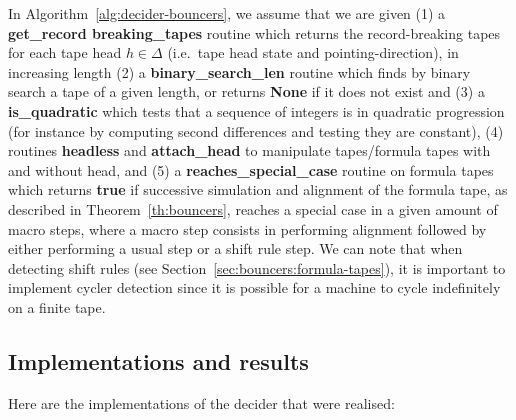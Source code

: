 \begin{remark}
    In Algorithm~\ref{alg:decider-bouncers}, we assume that we are given (1) a \textbf{get\_record breaking\_tapes} routine which returns the record-breaking tapes for each tape head $h\in\Delta$ (i.e.\ tape head state and pointing-direction), in increasing length (2) a \textbf{binary\_search\_len} routine which finds by binary search a tape of a given length, or returns \textbf{None} if it does not exist and (3) a \textbf{is\_quadratic} which tests that a sequence of integers is in quadratic progression (for instance by computing second differences and testing they are constant), (4) routines \textbf{headless} and \textbf{attach\_head} to manipulate tapes/formula tapes with and without head, and (5) a \textbf{reaches\_special\_case} routine on formula tapes which returns \textbf{true} if successive simulation and alignment of the formula tape, as described in Theorem~\ref{th:bouncers}, reaches a special case in a given amount of macro steps, where a macro step consists in performing alignment followed by either performing a usual step or a shift rule step. We can note that when detecting shift rules (see Section~\ref{sec:bouncers:formula-tapes}), it is important to implement cycler detection since it is possible for a machine to cycle indefinitely on a finite tape.
\end{remark}






\subsection{Implementations and results}\label{sec:bouncers-implem}


Here are the implementations of the decider that were realised:

